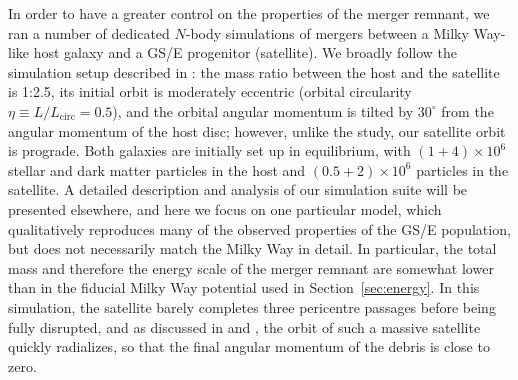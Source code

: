 \documentclass[a4paper,useAMS,usenatbib]{mnras}
\begin{document}
In order to have a greater control on the properties of the merger remnant, we ran a number of dedicated $N$-body simulations of mergers between a Milky Way-like host galaxy and a GS/E progenitor (satellite). We broadly follow the simulation setup described in \citet{Naidu2021}: the mass ratio between the host and the satellite is 1:2.5, its initial orbit is moderately eccentric (orbital circularity $\eta\equiv L/L_\mathrm{circ} = 0.5$), and the orbital angular momentum is tilted by $30^\circ$ from the angular momentum of the host disc; however, unlike the \cite{Naidu2021} study, our satellite orbit is prograde. Both galaxies are initially set up in equilibrium, with $(1+4)\times10^6$ stellar and dark matter particles in the host and $(0.5+2)\times10^6$ particles in the satellite. A detailed description and analysis of our simulation suite will be presented elsewhere, and here we focus on one particular model, which qualitatively reproduces many of the observed properties of the GS/E population, but does not necessarily match the Milky Way in detail. In particular, the total mass and therefore the energy scale of the merger remnant are somewhat lower than in the fiducial Milky Way potential used in Section~\ref{sec:energy}. In this simulation, the satellite barely completes three pericentre passages before being fully disrupted, and as discussed in \citet{Naidu2021} and \citealt{Vasiliev2022}, the orbit of such a massive satellite quickly radializes, so that the final angular momentum of the debris is close to zero. 
\end{document}
